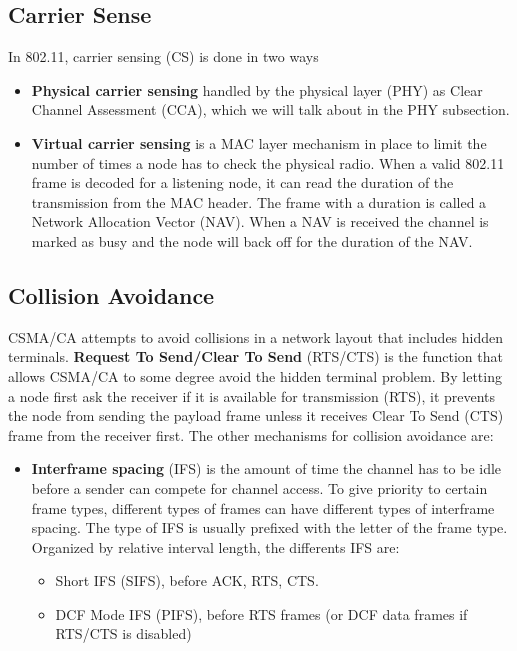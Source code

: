 {     \subsection{Carrier Sense}
     In 802.11, carrier sensing (CS) is done in two ways
     \begin{itemize}
     \item \textbf{Physical carrier sensing} handled by the physical layer (PHY) as Clear Channel Assessment (CCA), which we will talk about in the PHY subsection.
     \item \textbf{Virtual carrier sensing} is a MAC layer mechanism in place to limit the number of times
     a node has to check the physical radio. When a valid 802.11 frame is decoded for a listening node, it can read the duration of
     the transmission from the MAC header. The frame with a duration is called a Network Allocation Vector (NAV). When a NAV is received 
     the channel is marked as busy and the node will back off for the duration of the NAV. 
     \end{itemize} 


     \subsection{Collision Avoidance}
CSMA/CA attempts to avoid collisions in a network layout that includes hidden terminals. \textbf{Request To Send/Clear To Send} (RTS/CTS)
	is the function that allows CSMA/CA to some degree avoid the hidden terminal problem. By letting a node first ask the receiver if it is
	available for transmission (RTS), it prevents the node from sending the payload frame unless it receives Clear To Send (CTS) frame from the receiver first.
	The other mechanisms for collision avoidance are: 
	\begin{itemize}	
	\item \textbf{Interframe spacing} (IFS) is the amount of time the channel has to be idle before a sender can compete for channel access. 
	To give priority to certain frame types, different types of frames can have different types of interframe spacing. The type of IFS is usually 
	prefixed with the letter of the frame type. Organized by relative interval length, the differents IFS are:
	\begin{itemize} 
	\item Short IFS (SIFS), before ACK, RTS, CTS.  
\item DCF Mode IFS (PIFS), before RTS frames (or DCF data frames if RTS/CTS is disabled)


\end{itemize}
\end{itemize}}
